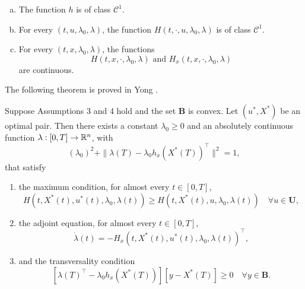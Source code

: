 \begin{assumption}\rm  %
\begin{enumerate}[(a)]
    \item The function $h$ is of class $\mathcal{C}^1$.
    \item For every $(t,u,\lambda_0,\lambda)$, the function $H(t,\cdot,u,\lambda_0,\lambda)$ is of class $\mathcal{C}^1$.
    \item For every $(t,x,\lambda_0,\lambda)$, the functions
     \[ H(t,x,\cdot,\lambda_0,\lambda) \mbox{ and }   H_x(t,x,\cdot,\lambda_0,\lambda)  \]
are continuous.
\end{enumerate}
\end{assumption}


The following theorem is proved in Yong \cite[Theorem 2.3.1]{Yong2015}.

\begin{theorem} Suppose Assumptions 3 and 4 hold and the set $\mathbf{B}$ is convex. Let $(u^\ast,X^\ast)$ be an optimal pair. Then there exists a constant $\lambda_0\geq 0$ and an absolutely continuous function $\lambda:[0,T]\to\mathbb{R}^n$, with
    \begin{equation}\label{RegConL}
        (\lambda_0)^2 + \|\lambda(T)-\lambda_0h_x(X^\ast(T))^\top\|^2 = 1,
    \end{equation}
that satisfy
\begin{enumerate}[\rm (a)]
    \item the maximum condition, for almost every $t\in[0,T]$, 
        \begin{equation}\label{MaxCond}
             H(t,X^\ast(t),u^\ast(t),\lambda_0,\lambda(t)) \geq  H(t,X^\ast(t),u,\lambda_0,\lambda(t)) \quad \forall u\in \mathbf{U},
        \end{equation}
\item the adjoint equation, for almost every $t\in[0,T]$, 
      \begin{equation}\label{AdjEq}
          \dot{\lambda}(t) = -H_x(t,X^\ast(t),u^\ast(t),\lambda_0,\lambda(t))^\top,  
      \end{equation}
\item and the transversality condition
   \begin{equation}\label{TransCond}
    [\lambda(T)^\top-\lambda_0h_x(X^\ast(T))] [y-X^\ast(T)]\geq 0 \quad \forall y\in \mathbf{B}.
   \end{equation}
\end{enumerate}
\end{theorem}


